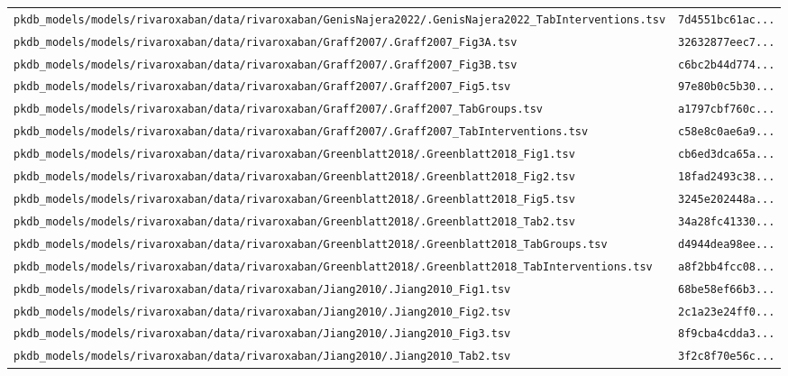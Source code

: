\documentclass{article}
\begin{document}
\begin{longtable}{ll}
\texttt{pkdb\_models/models/rivaroxaban/data/rivaroxaban/GenisNajera2022/.GenisNajera2022\_TabInterventions.tsv} & \texttt{7d4551bc61ac...} \\
\texttt{pkdb\_models/models/rivaroxaban/data/rivaroxaban/Graff2007/.Graff2007\_Fig3A.tsv} & \texttt{32632877eec7...} \\
\texttt{pkdb\_models/models/rivaroxaban/data/rivaroxaban/Graff2007/.Graff2007\_Fig3B.tsv} & \texttt{c6bc2b44d774...} \\
\texttt{pkdb\_models/models/rivaroxaban/data/rivaroxaban/Graff2007/.Graff2007\_Fig5.tsv} & \texttt{97e80b0c5b30...} \\
\texttt{pkdb\_models/models/rivaroxaban/data/rivaroxaban/Graff2007/.Graff2007\_TabGroups.tsv} & \texttt{a1797cbf760c...} \\
\texttt{pkdb\_models/models/rivaroxaban/data/rivaroxaban/Graff2007/.Graff2007\_TabInterventions.tsv} & \texttt{c58e8c0ae6a9...} \\
\texttt{pkdb\_models/models/rivaroxaban/data/rivaroxaban/Greenblatt2018/.Greenblatt2018\_Fig1.tsv} & \texttt{cb6ed3dca65a...} \\
\texttt{pkdb\_models/models/rivaroxaban/data/rivaroxaban/Greenblatt2018/.Greenblatt2018\_Fig2.tsv} & \texttt{18fad2493c38...} \\
\texttt{pkdb\_models/models/rivaroxaban/data/rivaroxaban/Greenblatt2018/.Greenblatt2018\_Fig5.tsv} & \texttt{3245e202448a...} \\
\texttt{pkdb\_models/models/rivaroxaban/data/rivaroxaban/Greenblatt2018/.Greenblatt2018\_Tab2.tsv} & \texttt{34a28fc41330...} \\
\texttt{pkdb\_models/models/rivaroxaban/data/rivaroxaban/Greenblatt2018/.Greenblatt2018\_TabGroups.tsv} & \texttt{d4944dea98ee...} \\
\texttt{pkdb\_models/models/rivaroxaban/data/rivaroxaban/Greenblatt2018/.Greenblatt2018\_TabInterventions.tsv} & \texttt{a8f2bb4fcc08...} \\
\texttt{pkdb\_models/models/rivaroxaban/data/rivaroxaban/Jiang2010/.Jiang2010\_Fig1.tsv} & \texttt{68be58ef66b3...} \\
\texttt{pkdb\_models/models/rivaroxaban/data/rivaroxaban/Jiang2010/.Jiang2010\_Fig2.tsv} & \texttt{2c1a23e24ff0...} \\
\texttt{pkdb\_models/models/rivaroxaban/data/rivaroxaban/Jiang2010/.Jiang2010\_Fig3.tsv} & \texttt{8f9cba4cdda3...} \\
\texttt{pkdb\_models/models/rivaroxaban/data/rivaroxaban/Jiang2010/.Jiang2010\_Tab2.tsv} & \texttt{3f2c8f70e56c...} \\

\end{longtable}
\end{document}
